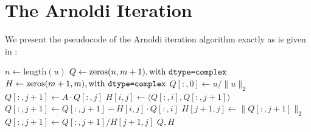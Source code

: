 \section{The Arnoldi Iteration}

We present the pseudocode of the Arnoldi iteration algorithm exactly as is given in \citet{arnoldi2025lab}:

\begin{algorithm}[H]
    \begin{algorithmic}
        \State$n\gets\text{length}(u)$
        \State$Q\gets\text{zeros}(n,m+1),\text{with }\verb|dtype=complex|$
        \State$H\gets\text{zeros}(m+1,m),\text{with }\verb|dtype=complex|$
        \State$Q[:,0]\gets u/\|u\|_2$
        \State$Q[:,j+1]\gets A\cdot Q[:,j]$
        \State$H[i,j]\gets\langle Q[:,i],Q[:,j+1]\rangle$
        \State$Q[:,j+1]\gets Q[:,j+1]-H[i,j]\cdot Q[:,i]$
        \EndFor
        \State$H[j+1,j]\gets\|Q[:,j+1]\|_2$
        \State$Q[:,j+1]\gets Q[:,j+1]/H[j+1,j]$
        \EndFor
        \State\Return$Q,H$
        \EndProcedure
    \end{algorithmic}
\end{algorithm}

